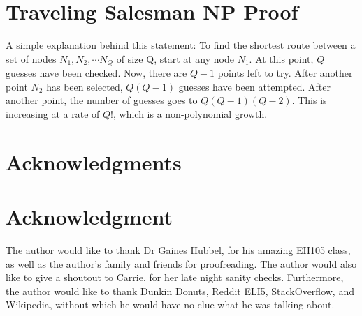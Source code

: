 \documentclass[10pt,journal,compsoc]{IEEEtran}
\begin{document}
\section{Traveling Salesman NP Proof}
A simple explanation behind this statement: To find the shortest route between a set of nodes $N_1,N_2,\cdots N_Q$ of size Q, start at any node $N_1$. At this point, $Q$ guesses have been checked. Now, there are $Q-1$ points left to try. After another point $N_2$ has been selected, $Q(Q-1)$ guesses have been attempted. After another point, the number of guesses goes to $Q(Q-1)(Q-2)$. This is increasing at a rate of $Q!$, which is a non-polynomial growth. 

\ifCLASSOPTIONcompsoc
  \section*{Acknowledgments}
\else
  \section*{Acknowledgment}
\fi


The author would like to thank Dr Gaines Hubbel, for his amazing EH105 class, as well as the author's family and friends for proofreading. The author would also like to give a shoutout to Carrie, for her late night sanity checks. Furthermore, the author would like to thank Dunkin Donuts, Reddit ELI5, StackOverflow, and Wikipedia, without which he would have no clue what he was talking about.


\ifCLASSOPTIONcaptionsoff
  \newpage
\fi





%
%
%
\end{document}
